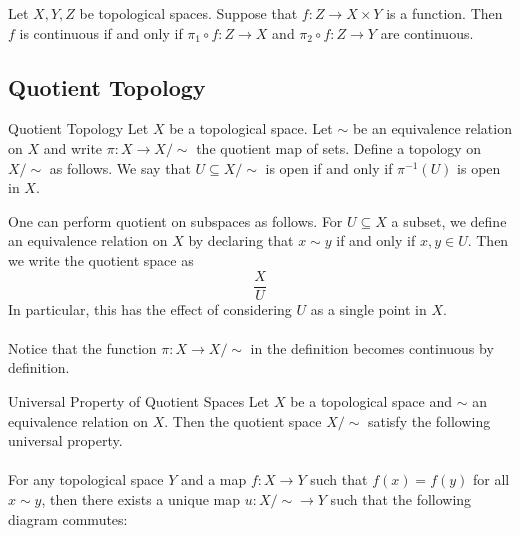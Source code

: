 \documentclass[a4paper]{article}
\begin{document}
\begin{prp}{}{} Let $X,Y,Z$ be topological spaces. Suppose that $f:Z\to X\times Y$ is a function. Then $f$ is continuous if and only if $\pi_1\circ f:Z\to X$ and $\pi_2\circ f:Z\to Y$ are continuous. 
\end{prp}

\subsection{Quotient Topology}
\begin{defn}{Quotient Topology}{} Let $X$ be a topological space. Let $\sim$ be an equivalence relation on $X$ and write $\pi:X\to X/\sim$ the quotient map of sets. Define a topology on $X/\sim$ as follows. We say that $U\subseteq X/\sim$ is open if and only if $\pi^{-1}(U)$ is open in $X$. 
\end{defn}

One can perform quotient on subspaces as follows. For $U\subseteq X$ a subset, we define an equivalence relation on $X$ by declaring that $x\sim y$ if and only if $x,y\in U$. Then we write the quotient space as $$\frac{X}{U}$$ In particular, this has the effect of considering $U$ as a single point in $X$. \\~\\

Notice that the function $\pi:X\to X/\sim$ in the definition becomes continuous by definition. 

\begin{prp}{Universal Property of Quotient Spaces}{} Let $X$ be a topological space and $\sim$ an equivalence relation on $X$. Then the quotient space $X/\sim$ satisfy the following universal property. \\~\\

For any topological space $Y$ and a map $f:X\to Y$ such that $f(x)=f(y)$ for all $x\sim y$, then there exists a unique map $u:X/\sim\to Y$ such that the following diagram commutes: \\~\\
 \\~\\
\end{prp}
\end{document}
